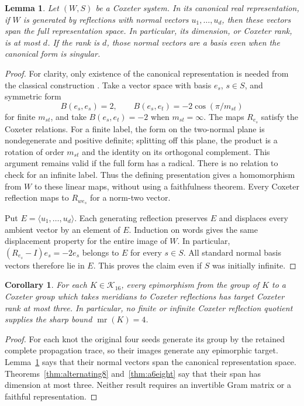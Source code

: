 \documentclass[11pt]{article}
\newtheorem{lemma}[theorem]{Lemma}
\newtheorem{corollary}[theorem]{Corollary}
\newcommand{\mr}{\operatorname{mr}}
\begin{document}
\begin{lemma}\label{lem:span}
Let $(W,S)$ be a Coxeter system. In its canonical real representation,
if $W$ is generated by reflections with normal vectors
$u_1,\ldots,u_d$, then these vectors span the full representation
space. In particular, its dimension, or Coxeter rank, is at most $d$.
If the rank is $d$, those normal vectors are a basis even when the
canonical form is singular.
\end{lemma}
\begin{proof}
For clarity, only existence of the canonical representation is needed
from the classical construction \cite[Section 6.12]{davis}.
Take a vector space with basis $e_s$, $s\in S$, and symmetric form
\[
 B(e_s,e_s)=2,\qquad
 B(e_s,e_t)=-2\cos(\pi/m_{st})
\]
for finite $m_{st}$, and take $B(e_s,e_t)=-2$ when $m_{st}=\infty$.
The maps $R_{e_s}$ satisfy the Coxeter relations. For a finite label,
the form on the two-normal plane is nondegenerate and positive
definite; splitting off this plane, the product is a rotation of
order $m_{st}$ and the identity on its orthogonal complement.
This argument remains valid if the full form has a radical.
There is no relation to check for an infinite label.
Thus the defining presentation gives a homomorphism from $W$ to
these linear maps, without using a faithfulness theorem.
Every Coxeter reflection maps to $R_{we_s}$ for a norm-two vector.

Put $E=\langle u_1,\ldots,u_d\rangle$. Each generating reflection
preserves $E$ and displaces every ambient vector by an element of
$E$. Induction on words gives the same displacement property for
the entire image of $W$. In particular,
$(R_{e_s}-I)e_s=-2e_s$ belongs to $E$ for every $s\in S$.
All standard normal basis vectors therefore lie in $E$.
This proves the claim even if $S$ was initially infinite.
\end{proof}

\begin{corollary}\label{cor:coxeter}
For each $K\in\mathcal K_{16}$, every
epimorphism from the group of $K$ to a Coxeter group
which takes meridians to Coxeter reflections has target Coxeter rank
at most three. In particular, no finite or infinite Coxeter reflection
quotient supplies the sharp bound $\mr(K)=4$.
\end{corollary}
\begin{proof}
For each knot the original four seeds generate its group by the
retained complete propagation trace, so their images generate any
epimorphic target. Lemma~\ref{lem:span} says
that their normal vectors span the canonical representation space.
Theorems~\ref{thm:alternating8} and~\ref{thm:a6eight} say that their
span has dimension at most three. Neither result requires an invertible Gram matrix or a
faithful representation.
\end{proof}
\end{document}
